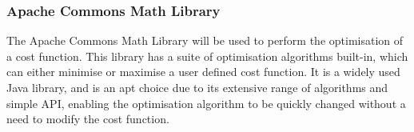 \subsubsection{Apache Commons Math Library}

The Apache Commons Math Library\cite{apachemath} will be used to perform the optimisation of a cost function. This library has a suite of optimisation algorithms built-in, which can either minimise or maximise a user defined cost function. It is a widely used Java library, and is an apt choice due to its extensive range of algorithms and simple API, enabling the optimisation algorithm to be quickly changed without a need to modify the cost function.